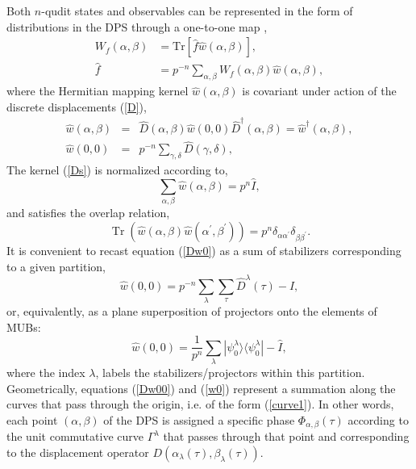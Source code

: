 \documentclass{article}
\DeclareMathOperator{\Tr}{Tr}
\begin{document}
Both $n$-qudit states and observables can be represented in the form of
distributions in the DPS through a one-to-one map
\cite{gross,DFW2-1,DFW2-2,DFW2-3,DFW2-4}, 
\begin{align}
  W_{f}\left( \alpha ,\beta \right)
  &= \mathrm{Tr}\left[ \hat{f}\hat{w}\left(
  \alpha ,\beta
  \right) \right],
  \label{map} \\
  \hat{f}
  &= p^{-n}\sum_{\alpha, \beta } W_{f}(\alpha,\beta) \hat{w}(\alpha,\beta),
\end{align}
where the Hermitian mapping kernel $\hat{w}\left(\alpha,\beta\right)$ is
covariant under action of the discrete displacements (\ref{D}),
\begin{eqnarray}
  \hat{w}\left(\alpha,\beta\right)
  &=& \hat{D}\left(\alpha,\beta\right) 
  \hat{w}\left( 0,0\right) \hat{D}^{\dagger }\left( \alpha ,\beta \right)
  = \hat{w}^{\dagger }(\alpha ,\beta ),
  \label{Ds} \\
  \hat{w}\left(0,0\right)
  &=& p^{-n} \sum_{\gamma,\delta} \hat{D}(\gamma,\delta),
  \label{Dw0}
\end{eqnarray}
The kernel (\ref{Ds}) is normalized according to, 
\begin{equation}
  \sum_{\alpha,\beta}\hat{w}\left(\alpha,\beta\right) = p^{n}\hat{I},
\end{equation}
and satisfies the overlap relation, 
\begin{equation}
  \Tr\left(
    \hat{w}(\alpha,\beta)\hat{w}(\alpha^{\prime},\beta^{\prime})
  \right)
  = p^{n} \delta_{\alpha \alpha^{\prime}} \delta_{\beta \beta^{\prime}}.
\end{equation}
It is convenient to recast equation (\ref{Dw0}) as a sum of stabilizers
corresponding to a given partition, 
\begin{equation}
  \hat{w}\left(0,0\right)
  = p^{-n} \sum_{\lambda} \sum_{\tau} \hat{D}^{\lambda}(\tau)-\hat{I},
  \label{Dw00}
\end{equation}
or, equivalently, as a plane superposition of projectors onto the elements of
MUBs:
\begin{equation}
  \hat{w}\left(0,0\right)
  = \frac{1}{p^{n}} \sum_{\lambda}
  |\psi_{0}^{\lambda}\rangle \langle \psi_{0}^{\lambda }|
  - \hat{I},
  \label{w0}
\end{equation}
where the index $\lambda$, labels the stabilizers/projectors within this
partition. Geometrically, equations (\ref{Dw00}) and (\ref{w0}) represent a
summation along the curves that pass through the origin, i.e. of the form
(\ref{curve1}). In other words, each point $(\alpha,\beta)$ of the DPS is assigned
a specific phase $\Phi_{\alpha,\beta } \left( \tau \right)$ according to the
unit commutative curve $\Gamma^{\lambda}$ that passes through that point and
corresponding to the displacement operator $D\left(\alpha_{\lambda }(\tau
),\beta_{\lambda }(\tau)\right)$.
\end{document}
